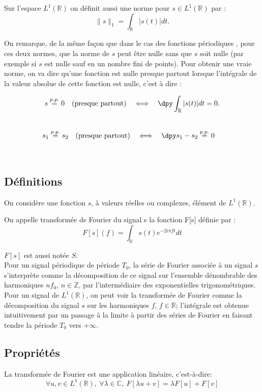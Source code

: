 Sur l'espace $L^1(\mathbb{R})$ on définit aussi une norme pour
$s\in L^1(\mathbb{R})$ par :
$$\|s\|_1=\int_\mathbb{R}|s(t)|dt. $$

On remarque, de la même fa\c{c}on que dans le cas des fonctions périodiques , pour ces deux normes, que la norme de $s$ peut être nulle sans que $s$ soit nulle (par
exemple si $s$ est nulle sauf en un nombre fini de points). Pour obtenir une
vraie norme, on va dire qu'une fonction est nulle presque partout lorsque 
l'intégrale de la valeur absolue de cette fonction est nulle, c'est à dire :

\begin{definition}\label{pp}
$$s\stackrel{p.p.}{=}0~~~\text{(presque partout)}~~~\Longleftrightarrow~~~
\dpy \int_\mathbb{R}|s(t)| dt=0.$$\\
$$s_1\stackrel{p.p.}{=}s_2~~~\text{(presque partout)}~~~\Longleftrightarrow~~~
\dpy s_1-s_2\stackrel{p.p.}{=}0~~~$$ 
\end{definition}
~~\\
 
\subsection{Définitions}
On considère une fonction $s$, à valeurs réelles ou complexes, élément de $L^1(\mathbb{R})$. 
\begin{definition} On appelle transformée de Fourier du signal s la fonction F[s] définie par :
$$F[s](f)=\int_\mathbb{R}s(t)e^{-2i\pi ft}dt$$
\end{definition}
$F[s]$ est aussi notée $S$.
~~\\

Pour un signal périodique de période $T_0$, la série de Fourier associée à un signal $s$ s'interprète comme la décomposition de ce signal sur l'ensemble dénombrable des harmoniques $nf_0$, $n\in\mathbb{Z}$, par l'intermédiaire des exponentielles trigonométriques. Pour un signal de $L^1(\mathbb{R})$, on peut voir la transformée de Fourier comme la décomposition du signal $s$ sur les harmoniques $f$, $f\in\mathbb{R}$; l'intégrale est obtenue intuitivement par un passage à la limite à partir des séries de Fourier en faisant tendre la période $T_0$ vers +$\infty$.

\subsection{Propriétés}

\begin{prot} La transformée de Fourier est une application linéaire, c'est-à-dire: 
$$\forall u, v \in L^1(\mathbb{R}),\ \forall\lambda \in \mathbb{C},\ F[\lambda u+v]=\lambda F[u]+F[v]$$ 
\end{prot}
~~\

